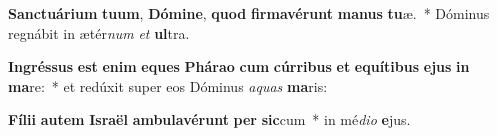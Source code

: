 \item \textbf{Sanc}\textbf{tu}\textbf{á}\textbf{ri}\textbf{um} \textbf{tu}\textbf{um}, \textbf{Dó}\textbf{mi}\textbf{ne}, \textbf{quod} \textbf{fir}\textbf{ma}\textbf{vé}\textbf{runt} \textbf{ma}\textbf{nus} \textbf{tu}æ.~* Dóminus regnábit in ætér\textit{num} \textit{et} \textbf{ul}tra.
\item \textbf{In}\textbf{grés}\textbf{sus} \textbf{est} \textbf{e}\textbf{nim} \textbf{e}\textbf{ques} \textbf{Phá}\textbf{ra}\textbf{o} \textbf{cum} \textbf{cúr}\textbf{ri}\textbf{bus} \textbf{et} \textbf{e}\textbf{quí}\textbf{ti}\textbf{bus} \textbf{e}\textbf{jus} \textbf{in} \textbf{ma}re:~* et redúxit super eos Dóminus \textit{a}\textit{quas} \textbf{ma}ris:
\item \textbf{Fí}\textbf{li}\textbf{i} \textbf{au}\textbf{tem} \textbf{Is}\textbf{ra}\textbf{ël} \textbf{am}\textbf{bu}\textbf{la}\textbf{vé}\textbf{runt} \textbf{per} \textbf{sic}cum~* in mé\textit{di}\textit{o} \textbf{e}jus.
